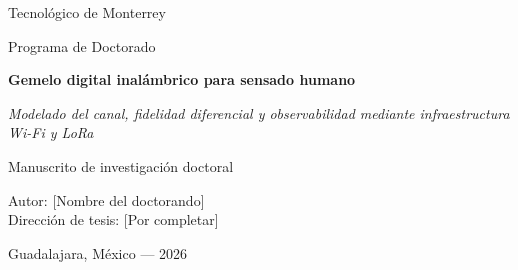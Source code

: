\hypersetup{pageanchor=false}

\begin{titlepage}
    \centering
    {\Large Tecnológico de Monterrey\par}
    \vspace{1.2cm}
    {\large Programa de Doctorado\par}
    \vfill
    {\Huge\bfseries Gemelo digital inalámbrico para sensado humano\par}
    \vspace{0.7cm}
    {\Large\itshape Modelado del canal, fidelidad diferencial y observabilidad mediante infraestructura Wi-Fi y LoRa\par}
    \vfill
    {\large Manuscrito de investigación doctoral\par}
    \vspace{0.4cm}
    {\large Autor: [Nombre del doctorando]\\[0.2cm]
    Dirección de tesis: [Por completar]\par}
    \vfill
    {\large Guadalajara, México --- 2026\par}
\end{titlepage}
